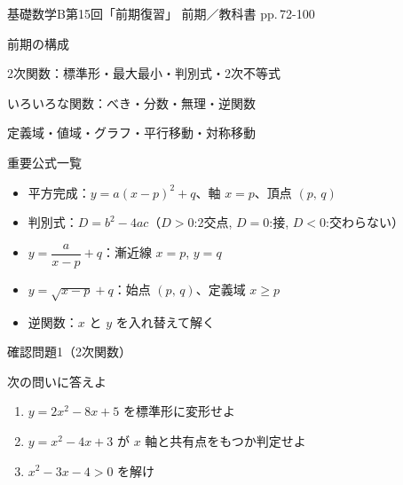 \documentclass[aspectratio=43,professionalfonts,handout]{beamer}
\newcommand{\LectureNum}{15}
\newcommand{\LectureTitle}{前期復習}
\newcommand{\TextPages}{pp.\,72-100}
\newcommand{\CourseName}{基礎数学B}
\renewcommand{\TermName}{前期}
\begin{document}
\begin{frame}{\CourseName\quad 第\LectureNum 回「\LectureTitle 」}
  {\small \TermName\quad \TeacherName\quad ／\quad 教科書 \TextPages}

  \begin{block}{前期の構成}
  \begin{description}[labelwidth=5.5em]
    \item[\kw{3章1節}] 2次関数：標準形・最大最小・判別式・2次不等式
    \item[\kw{3章2節}] いろいろな関数：べき・分数・無理・逆関数
    \item[\kw{共通テーマ}] 定義域・値域・グラフ・平行移動・対称移動
  \end{description}
  \end{block}
\end{frame}

\begin{frame}{重要公式一覧}
  \begin{block}{}
  \begin{itemize}
    \item 平方完成：$y=a(x-p)^2+q$、軸 $x=p$、頂点 $(p,\,q)$
    \item 判別式：$D=b^2-4ac$（$D>0$:2交点, $D=0$:接, $D<0$:交わらない）
    \item $y=\dfrac{a}{x-p}+q$：漸近線 $x=p$, $y=q$
    \item $y=\sqrt{x-p}+q$：始点 $(p,\,q)$、定義域 $x\geq p$
    \item 逆関数：$x$ と $y$ を入れ替えて解く
  \end{itemize}
  \end{block}
\end{frame}

\begin{frame}{確認問題1（2次関数）}
  \begin{block}{次の問いに答えよ}
    \begin{enumerate}
      \item $y=2x^2-8x+5$ を標準形に変形せよ
      \item $y=x^2-4x+3$ が $x$ 軸と共有点をもつか判定せよ
      \item $x^2-3x-4>0$ を解け
    \end{enumerate}
  \end{block}
\end{frame}
\end{document}
